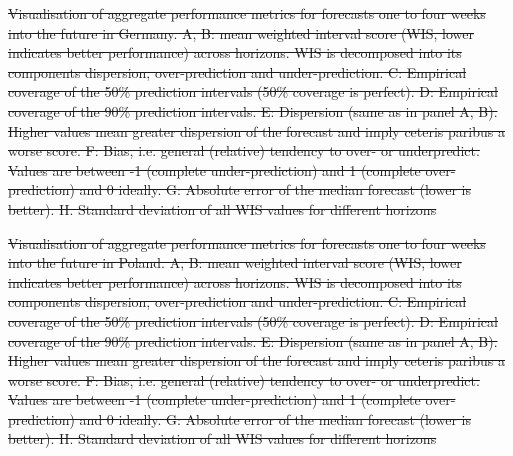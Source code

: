 \documentclass[10pt,letterpaper]{article}
\providecommand{\DIFdeltex}[1]{{\protect\color{red}\sout{#1}}}                      %
\providecommand{\DIFdelFL}[1]{\DIFdel{#1}} %
\providecommand{\DIFdel}[1]{\texorpdfstring{\DIFdeltex{#1}}{}} %
\begin{document}
{%
\DIFdelFL{Visualisation of aggregate performance metrics for forecasts one to four weeks into the future in Germany. A, B: mean weighted interval score (WIS, lower indicates better performance) across horizons. WIS is decomposed into its components dispersion, over-prediction and under-prediction. C: Empirical coverage of the 50\% prediction intervals (50\% coverage is perfect). D: Empirical coverage of the 90\% prediction intervals. E: Dispersion (same as in panel A, B). Higher values mean greater dispersion of the forecast and imply ceteris paribus a worse score. F: Bias, i.e. general (relative) tendency to over- or underpredict. Values are between -1 (complete under-prediction) and 1 (complete over-prediction) and 0 ideally. G: Absolute error of the median forecast (lower is better). H. Standard deviation of all WIS values for different horizons}}%


{%
\DIFdelFL{Visualisation of aggregate performance metrics for forecasts one to four weeks into the future in Poland. A, B: mean weighted interval score (WIS, lower indicates better performance) across horizons. WIS is decomposed into its components dispersion, over-prediction and under-prediction. C: Empirical coverage of the 50\% prediction intervals (50\% coverage is perfect). D: Empirical coverage of the 90\% prediction intervals. E: Dispersion (same as in panel A, B). Higher values mean greater dispersion of the forecast and imply ceteris paribus a worse score. F: Bias, i.e. general (relative) tendency to over- or underpredict. Values are between -1 (complete under-prediction) and 1 (complete over-prediction) and 0 ideally. G: Absolute error of the median forecast (lower is better). H. Standard deviation of all WIS values for different horizons}}%
\end{document}
